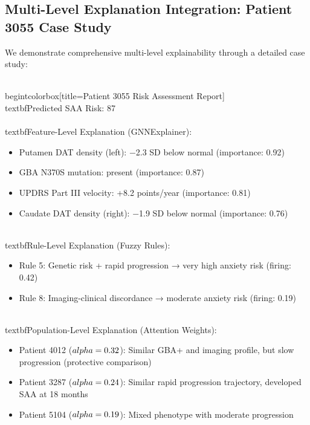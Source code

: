 \documentclass[conference]{IEEEtran}
\begin{document}
{{{\subsection{Multi-Level Explanation Integration: Patient 3055 Case Study}

We demonstrate comprehensive multi-level explainability through a detailed case study:

\\begin{tcolorbox}[title=Patient 3055 Risk Assessment Report]
\\textbf{Predicted SAA Risk:} 87\\%

\\textbf{Feature-Level Explanation (GNNExplainer):}
\begin{itemize}
\item Putamen DAT density (left): −2.3 SD below normal (importance: 0.92)
\item GBA N370S mutation: present (importance: 0.87)
\item UPDRS Part III velocity: +8.2 points/year (importance: 0.81)
\item Caudate DAT density (right): −1.9 SD below normal (importance: 0.76)
\end{itemize}

\\textbf{Rule-Level Explanation (Fuzzy Rules):}
\begin{itemize}
\item Rule 5: Genetic risk + rapid progression → very high anxiety risk (firing: 0.42)
\item Rule 8: Imaging-clinical discordance → moderate anxiety risk (firing: 0.19)
\end{itemize}

\\textbf{Population-Level Explanation (Attention Weights):}
\begin{itemize}
\item Patient 4012 ($\\alpha=0.32$): Similar GBA+ and imaging profile, but slow progression (protective comparison)
\item Patient 3287 ($\\alpha=0.24$): Similar rapid progression trajectory, developed SAA at 18 months
\item Patient 5104 ($\\alpha=0.19$): Mixed phenotype with moderate progression
\end{itemize}

}}}
\end{document}
